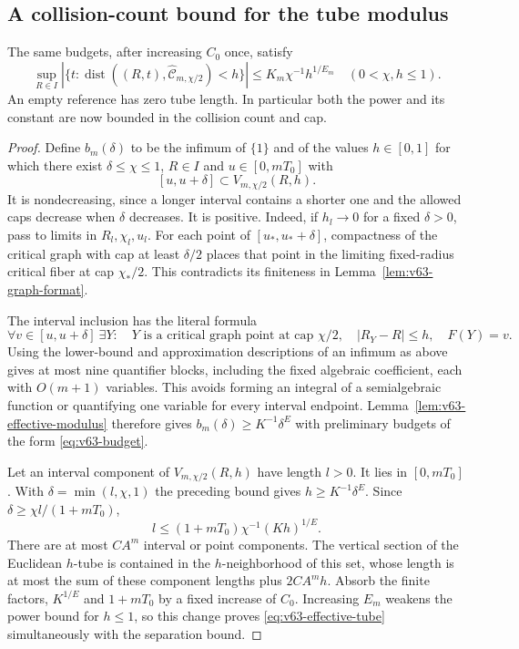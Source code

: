 \subsection{A collision-count bound for the tube modulus}
\begin{theorem}
\label{thm:v63-effective-tube}
The same budgets, after increasing $C_0$ once, satisfy
\begin{equation}\label{eq:v63-effective-tube}
 \sup_{R\in I}|\{t:\operatorname{dist}((R,t),
                      \widehat{\mathcal C}_{m,\chi/2})<h\}|
       \le K_m\chi^{-1}h^{1/E_m}
       \quad(0<\chi,h\le1).
\end{equation}
An empty reference has zero tube length. In particular both the power
and its constant are now bounded in the collision count and cap.
\end{theorem}
\begin{proof}
Define $b_m(\delta)$ to be the infimum of $\{1\}$ and of the values
$h\in[0,1]$ for which there exist $\delta\le\chi\le1$, $R\in I$
and $u\in[0,mT_0]$ with
\[
 [u,u+\delta]\subset V_{m,\chi/2}(R,h).
\]
It is nondecreasing, since a longer interval contains a shorter one
and the allowed caps decrease when $\delta$ decreases. It is positive.
Indeed, if $h_l\to0$ for a fixed $\delta>0$, pass to limits in
$R_l,\chi_l,u_l$. For each point of $[u_*,u_*+\delta]$, compactness
of the critical graph with cap at least $\delta/2$ places that point
in the limiting fixed-radius critical fiber at cap $\chi_*/2$. This
contradicts its finiteness in Lemma~\ref{lem:v63-graph-format}.

The interval inclusion has the literal formula
\[
 \forall v\in[u,u+\delta]\ \exists Y:\quad
 Y\text{ is a critical graph point at cap }\chi/2,\quad
 |R_Y-R|\le h,\quad F(Y)=v.
\]
Using the lower-bound and approximation descriptions of an infimum
as above gives at most nine quantifier blocks, including the fixed
algebraic coefficient, each with $O(m+1)$ variables. This avoids
forming an integral of a semialgebraic function or quantifying one
variable for every interval endpoint. Lemma~\ref{lem:v63-effective-modulus}
therefore gives $b_m(\delta)\ge K^{-1}\delta^E$ with preliminary
budgets of the form \eqref{eq:v63-budget}.

Let an interval component of $V_{m,\chi/2}(R,h)$ have length $l>0$.
It lies in $[0,mT_0]$. With $\delta=\min(l,\chi,1)$ the preceding
bound gives $h\ge K^{-1}\delta^E$. Since
$\delta\ge\chi l/(1+mT_0)$,
\[
 l\le (1+mT_0)\chi^{-1}(Kh)^{1/E}.
\]
There are at most $CA^m$ interval or point components. The vertical
section of the Euclidean $h$-tube is contained in the $h$-neighborhood
of this set, whose length is at most the sum of these component
lengths plus $2CA^m h$. Absorb the finite factors, $K^{1/E}$ and
$1+mT_0$ by a fixed increase of $C_0$. Increasing $E_m$ weakens the
power bound for $h\le1$, so this change proves
\eqref{eq:v63-effective-tube} simultaneously with the separation
bound.
\end{proof}

